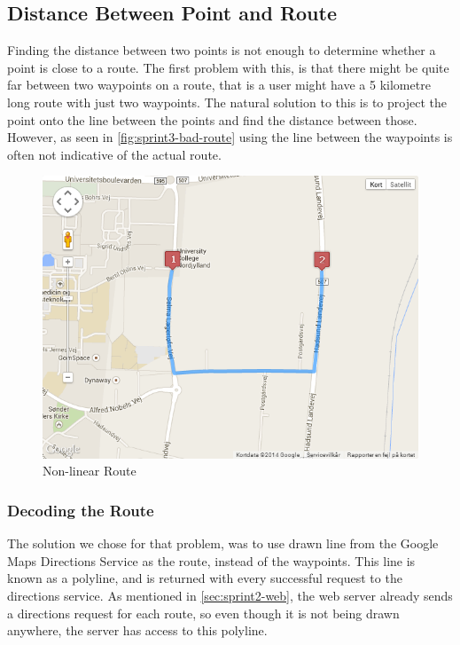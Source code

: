 \subsection{Distance Between Point and Route}

Finding the distance between two points is not enough to determine whether a point is close to a route. The first problem with this, is that there might be quite far between two waypoints on a route, that is a user might have a 5 kilometre long route with just two waypoints. The natural solution to this is to project the point onto the line between the points and find the distance between those. However, as seen in \autoref{fig:sprint3-bad-route} using the line between the waypoints is often not indicative of the actual route.

\begin{figure}[ht]
 \centering
 \includegraphics[scale=0.5]{img/sprint3br.png}
 \caption{Non-linear Route}
 \label{fig:sprint3-bad-route}
\end{figure}

\subsubsection{Decoding the Route}

The solution we chose for that problem, was to use drawn line from the Google Maps Directions Service as the route, instead of the waypoints. This line is known as a polyline, and is returned with every successful request to the directions service. As mentioned in \autoref{sec:sprint2-web}, the web server already sends a directions request for each route, so even though it is not being drawn anywhere, the server has access to this polyline. 

